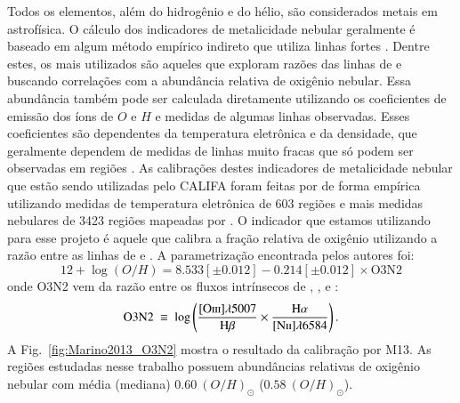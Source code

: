 Todos os elementos, além do hidrogênio e do hélio, são considerados metais em astrofísica. O cálculo
dos indicadores de metalicidade nebular geralmente é baseado em algum método empírico indireto que
utiliza linhas fortes \citep[\emph{strong-line methods}; ][]{Pagel.etal.1979a}. Dentre estes, os
mais utilizados são aqueles que exploram razões das linhas de \OIII e \NII buscando correlações com
a abundância relativa de oxigênio nebular. Essa abundância também pode ser calculada diretamente
utilizando os coeficientes de emissão dos íons de $O$ e $H$ e medidas de algumas linhas observadas.
Esses coeficientes são dependentes da temperatura eletrônica e da densidade, que geralmente
dependem de medidas de linhas muito fracas que só podem ser observadas em regiões \Hii. As
calibrações destes indicadores de metalicidade nebular que estão sendo utilizadas pelo CALIFA foram
feitas por \citet[][M13 daqui em diante]{Marino.etal.2013a} de forma empírica utilizando medidas de
temperatura eletrônica de 603 regiões \Hii e mais medidas nebulares de 3423 regiões \Hii mapeadas
por \citet{Sanchez.etal.2013a}. O indicador que estamos utilizando para esse projeto é aquele que
calibra a fração relativa de oxigênio utilizando a razão entre as linhas de \oIII e \nII. A
parametrização encontrada pelos autores foi:
\begin{equation}
	12 + \log (O/H) = 8.533[\pm0.012] - 0.214[\pm0.012]\times \textrm{O3N2}
\end{equation}
\noindent onde O3N2 vem da razão entre os fluxos intrínsecos de \oIII, \Hbeta, \nII e \Halpha:
\begin{equation}
	\textrm{O3N2}\ \equiv\ \log \left(\frac{\OIII}{\Hbeta} \times \frac{\Halpha}{\NII}\right). 
\end{equation}
A Fig.\ \ref{fig:Marino2013_O3N2} mostra o resultado da calibração por M13. As regiões estudadas
nesse trabalho possuem abundâncias relativas de oxigênio nebular com média (mediana) $0.60\
(O/H)_\odot$ ($0.58\ (O/H)_\odot$).

